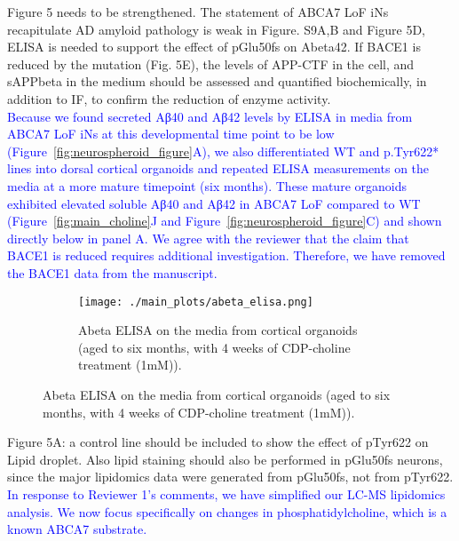Figure 5 needs to be strengthened. The statement of ABCA7 LoF iNs recapitulate AD amyloid pathology is weak in Figure. S9A,B and Figure 5D, ELISA is needed to support the effect of pGlu50fs on Abeta42. If BACE1 is reduced by the mutation (Fig. 5E), the levels of APP-CTF in the cell, and sAPPbeta in the medium should be assessed and quantified biochemically, in addition to IF, to confirm the reduction of enzyme activity.\\
\textcolor{blue}{Because we found secreted Aβ40 and Aβ42 levels by ELISA in media from ABCA7 LoF iNs at this developmental time point to be low (Figure~\ref{fig:neurospheroid_figure}A), we also differentiated WT and p.Tyr622* lines into dorsal cortical organoids and repeated ELISA measurements on the media at a more mature timepoint (six months). These mature organoids exhibited elevated soluble Aβ40 and Aβ42 in ABCA7 LoF compared to WT (Figure~\ref{fig:main_choline}J and Figure~\ref{fig:neurospheroid_figure}C) and shown directly below in panel A. We agree with the reviewer that the claim that BACE1 is reduced requires additional investigation. Therefore, we have removed the BACE1 data from the manuscript.}

\begin{figure}[H] 
	\centering
	\begin{subfigure}[t]{.6\textwidth}
		\caption{Abeta ELISA on the media from cortical organoids (aged to six months, with 4 weeks of CDP-choline treatment (1mM)).}
		\texttt{[image: ./main\_plots/abeta\_elisa.png]}        
	\end{subfigure}  
\end{figure}

Figure 5A: a control line should be included to show the effect of pTyr622 on Lipid droplet. Also lipid staining should also be performed in pGlu50fs neurons, since the major lipidomics data were generated from pGlu50fs, not from pTyr622.\\
\textcolor{blue}{In response to Reviewer 1’s comments, we have simplified our LC-MS lipidomics analysis. We now focus specifically on changes in phosphatidylcholine, which is a known ABCA7 substrate.}



